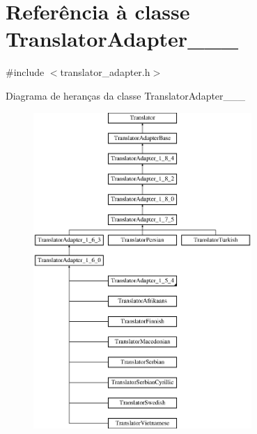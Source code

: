 \hypertarget{class_translator_adapter__1__7__5}{\section{Referência à classe Translator\-Adapter\-\_\-\_\-\_}
\label{class_translator_adapter__1__7__5}
}


{\ttfamily \#include $<$translator\-\_\-adapter.\-h$>$}

Diagrama de heranças da classe Translator\-Adapter\-\_\-\_\-\_\begin{figure}[H]
\begin{center}
\leavevmode
\includegraphics[height=12.000000cm]{class_translator_adapter__1__7__5}
\end{center}
\end{figure}
